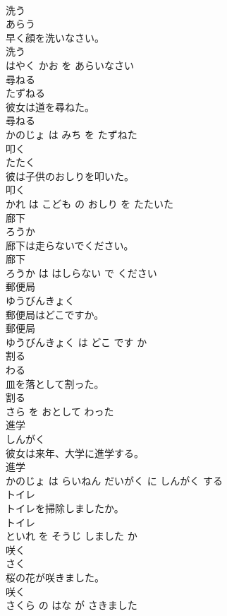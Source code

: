 \documentclass[8pt]{extreport}
\begin{document}
\begin{CJK}{UTF8}{min}
\\	洗う	
\\	あらう			
\\	早く顔を洗いなさい。	
\\	洗う 
\\	はやく かお を あらいなさい			
\\	尋ねる	
\\	たずねる			
\\	彼女は道を尋ねた。	
\\	尋ねる 
\\	かのじょ は みち を たずねた			
\\	叩く	
\\	たたく			
\\	彼は子供のおしりを叩いた。	
\\	叩く 
\\	かれ は こども の おしり を たたいた			
\\	廊下	
\\	ろうか			
\\	廊下は走らないでください。	
\\	廊下 
\\	ろうか は はしらない で ください			
\\	郵便局	
\\	ゆうびんきょく			
\\	郵便局はどこですか。	
\\	郵便局 
\\	ゆうびんきょく は どこ です か			
\\	割る	
\\	わる			
\\	皿を落として割った。	
\\	割る 
\\	さら を おとして わった			
\\	進学	
\\	しんがく			
\\	彼女は来年、大学に進学する。	
\\	進学 
\\	かのじょ は らいねん だいがく に しんがく する			
\\	トイレ	
\\	トイレを掃除しましたか。	
\\	トイレ 
\\	といれ を そうじ しました か			
\\	咲く	
\\	さく			
\\	桜の花が咲きました。	
\\	咲く 
\\	さくら の はな が さきました			

\end{CJK}
\end{document}
